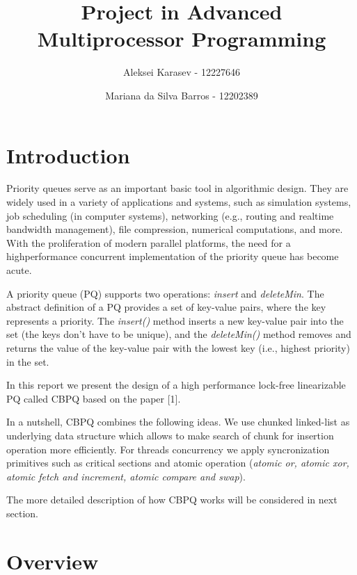 \documentclass{article}
\begin{document}
\title{Project in Advanced Multiprocessor Programming}
\author[1]{Aleksei Karasev - 12227646}
\author[2]{Mariana da Silva Barros - 12202389}
\maketitle

\section{Introduction}
Priority queues serve as an important basic tool in algorithmic design.
They are widely used in a variety of applications and systems, such as simulation systems, job scheduling (in computer systems), networking (e.g., routing and realtime bandwidth management), file compression, numerical computations, and
more. With the proliferation of modern parallel platforms, the need for a highperformance concurrent implementation of the priority queue has become acute.\par
A priority queue (PQ) supports two operations: \textit{insert} and \textit{deleteMin}. The
abstract definition of a PQ provides a set of key-value pairs, where the key
represents a priority. The \textit{insert()} method inserts a new key-value pair into the
set (the keys don’t have to be unique), and the \textit{deleteMin()} method removes and
returns the value of the key-value pair with the lowest key (i.e., highest priority)
in the set.\par
In this report we present the design of a high performance lock-free linearizable PQ called CBPQ based on the paper [1].\par
In a nutshell, CBPQ combines the following ideas. We use chunked linked-list as underlying data structure which allows to make search of chunk for insertion operation more efficiently. For threads concurrency we apply syncronization primitives such as critical sections and atomic operation (\textit{atomic or, atomic xor, atomic fetch and increment, atomic compare and swap}).\par
The more detailed description of how CBPQ works will be considered in next section.

\section{Overview}
\end{document}

